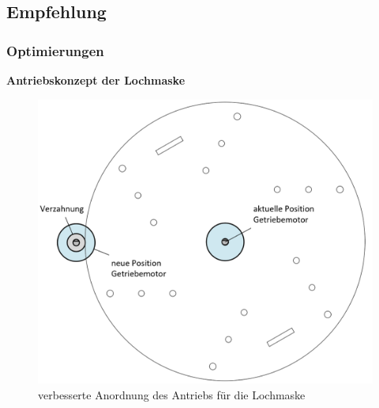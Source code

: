\subsection{Empfehlung}

\subsubsection{Optimierungen}

\textbf{Antriebskonzept der Lochmaske}

\begin{figure}[H]
	\includegraphics[scale=0.5]{Illustrationen/8-Fazit/optimierung_lochmaske.png}
	\caption{verbesserte Anordnung des Antriebs für die Lochmaske}
	\label{fig:optimierung_lochmaske}
\end{figure}